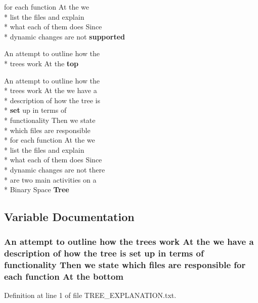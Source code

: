 \begin{DoxyCompactItemize}
for each function At the we \\*
list the files and explain \\*
what each of them does Since \\*
dynamic changes are not {\bf supported}
\item 
An attempt to outline how the \\*
trees work At the {\bf top}
\item 
An attempt to outline how the \\*
trees work At the we have a \\*
description of how the tree is \\*
{\bf set} up in terms of \\*
functionality Then we state \\*
which files are responsible \\*
for each function At the we \\*
list the files and explain \\*
what each of them does Since \\*
dynamic changes are not there \\*
are two main activities on a \\*
Binary Space {\bf Tree}
\end{DoxyCompactItemize}


\subsection{Variable Documentation}
\subsubsection[{bottom}]{\setlength{\rightskip}{0pt plus 5cm}An attempt to outline how the trees work At the we have a description of how the tree is {\bf set} up in terms of functionality Then we state which files are responsible for each function At the bottom}\label{TREE__EXPLANATION_8txt_a20e36b6ed26fcad11df40d5203e21f49}


Definition at line 1 of file T\-R\-E\-E\-\_\-\-E\-X\-P\-L\-A\-N\-A\-T\-I\-O\-N.\-txt.

